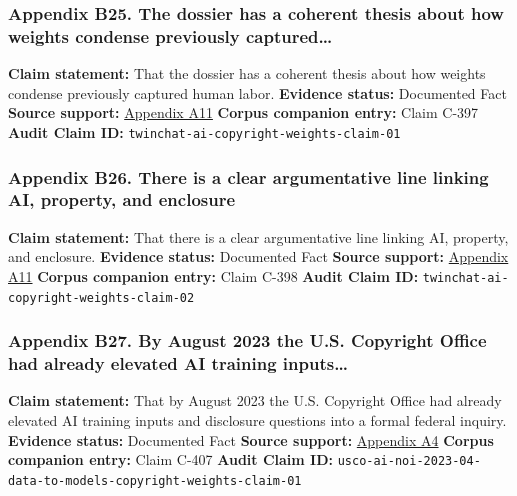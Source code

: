 \documentclass[
  american,
  11pt,
  letterpaper,
]{article}
\begin{document}
\subsubsection{Appendix B25. The dossier has a coherent thesis about how
weights condense previously
captured\ldots{}}\label{appendix-b25-the-dossier-has-a-coherent-thesis-about-how-weights-condense-previously-captured}

\textbf{Claim statement:} That the dossier has a coherent thesis about
how weights condense previously captured human labor. \textbf{Evidence
status:} Documented Fact \textbf{Source support:}
\hyperref[appendix-a11-ai-copyright-weights-a-new-frontier-in-intellectual-property-law]{Appendix
A11} \textbf{Corpus companion entry:} Claim C-397 \textbf{Audit Claim
ID:} \texttt{twinchat-ai-copyright-weights-claim-01}

\subsubsection{Appendix B26. There is a clear argumentative line linking
AI, property, and
enclosure}\label{appendix-b26-there-is-a-clear-argumentative-line-linking-ai-property-and-enclosure}

\textbf{Claim statement:} That there is a clear argumentative line
linking AI, property, and enclosure. \textbf{Evidence status:}
Documented Fact \textbf{Source support:}
\hyperref[appendix-a11-ai-copyright-weights-a-new-frontier-in-intellectual-property-law]{Appendix
A11} \textbf{Corpus companion entry:} Claim C-398 \textbf{Audit Claim
ID:} \texttt{twinchat-ai-copyright-weights-claim-02}

\subsubsection{Appendix B27. By August 2023 the U.S. Copyright Office
had already elevated AI training
inputs\ldots{}}\label{appendix-b27-by-august-2023-the-u-s-copyright-office-had-already-elevated-ai-training-inputs}

\textbf{Claim statement:} That by August 2023 the U.S. Copyright Office
had already elevated AI training inputs and disclosure questions into a
formal federal inquiry. \textbf{Evidence status:} Documented Fact
\textbf{Source support:}
\hyperref[appendix-a4-copyright-and-artificial-intelligence-notice-of-inquiry]{Appendix
A4} \textbf{Corpus companion entry:} Claim C-407 \textbf{Audit Claim
ID:}
\texttt{usco-ai-noi-2023-04-data-to-models-copyright-weights-claim-01}
\end{document}
